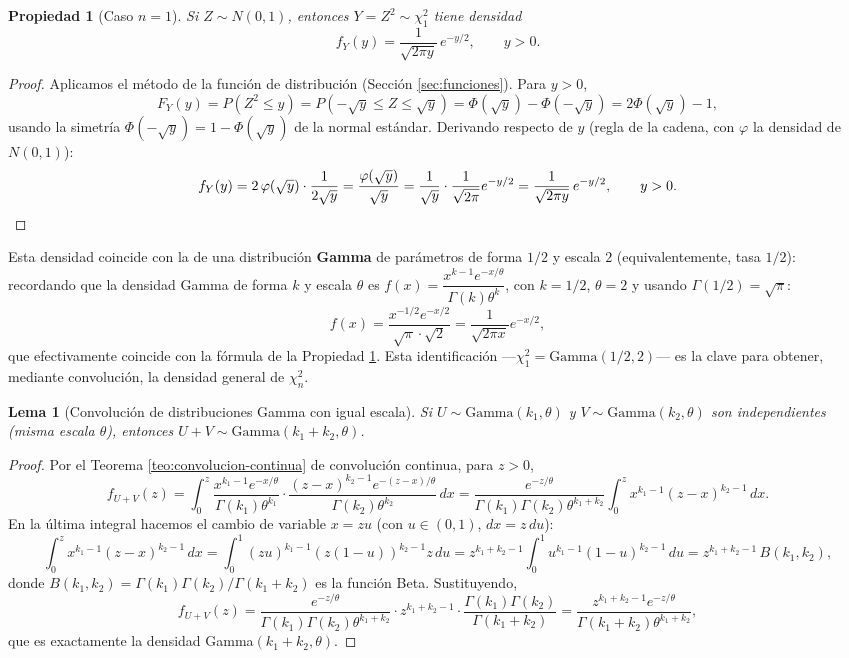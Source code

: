 \documentclass[11pt,a4paper]{article}
\theoremstyle{plain}
\newtheorem{propiedad}[teorema]{Propiedad}
\newtheorem{lema}[teorema]{Lema}
\theoremstyle{definition}
\theoremstyle{remark}
\begin{document}
\begin{propiedad}[Caso $n=1$]\label{prop:chi-uno}
Si $Z\sim N(0,1)$, entonces $Y=Z^2\sim\chi_1^2$ tiene densidad
\[
f_Y(y) = \frac{1}{\sqrt{2\pi y}}\,e^{-y/2}, \qquad y>0.
\]
\end{propiedad}

\begin{proof}
Aplicamos el método de la función de distribución (Sección \ref{sec:funciones}). Para $y>0$,
\[
F_Y(y) = P(Z^2\le y) = P(-\sqrt y\le Z\le \sqrt y) = \Phi(\sqrt y)-\Phi(-\sqrt y) = 2\Phi(\sqrt y)-1,
\]
usando la simetría $\Phi(-\sqrt y)=1-\Phi(\sqrt y)$ de la normal estándar. Derivando respecto de $y$ (regla de la cadena, con $\varphi$ la densidad de $N(0,1)$):
\[
f_Y(y) = 2\,\varphi(\sqrt y)\cdot\frac{1}{2\sqrt y} = \frac{\varphi(\sqrt y)}{\sqrt y} = \frac{1}{\sqrt y}\cdot\frac{1}{\sqrt{2\pi}}e^{-y/2} = \frac{1}{\sqrt{2\pi y}}\,e^{-y/2}, \qquad y>0. \qedhere
\]
\end{proof}

Esta densidad coincide con la de una distribución \textbf{Gamma} de parámetros de forma $1/2$ y escala $2$ (equivalentemente, tasa $1/2$): recordando que la densidad Gamma de forma $k$ y escala $\theta$ es $f(x) = \dfrac{x^{k-1}e^{-x/\theta}}{\Gamma(k)\theta^k}$, con $k=1/2$, $\theta=2$ y usando $\Gamma(1/2)=\sqrt\pi$:
\[
f(x) = \frac{x^{-1/2}e^{-x/2}}{\sqrt\pi\cdot\sqrt2} = \frac{1}{\sqrt{2\pi x}}e^{-x/2},
\]
que efectivamente coincide con la fórmula de la Propiedad \ref{prop:chi-uno}. Esta identificación —$\chi_1^2 = \text{Gamma}(1/2,2)$— es la clave para obtener, mediante convolución, la densidad general de $\chi_n^2$.

\begin{lema}[Convolución de distribuciones Gamma con igual escala]\label{lema:convolucion-gamma}
Si $U\sim\text{Gamma}(k_1,\theta)$ y $V\sim\text{Gamma}(k_2,\theta)$ son independientes (misma escala $\theta$), entonces $U+V\sim\text{Gamma}(k_1+k_2,\theta)$.
\end{lema}

\begin{proof}
Por el Teorema \ref{teo:convolucion-continua} de convolución continua, para $z>0$,
\[
f_{U+V}(z) = \int_0^z \frac{x^{k_1-1}e^{-x/\theta}}{\Gamma(k_1)\theta^{k_1}}\cdot\frac{(z-x)^{k_2-1}e^{-(z-x)/\theta}}{\Gamma(k_2)\theta^{k_2}}\,dx = \frac{e^{-z/\theta}}{\Gamma(k_1)\Gamma(k_2)\theta^{k_1+k_2}}\int_0^z x^{k_1-1}(z-x)^{k_2-1}\,dx.
\]
En la última integral hacemos el cambio de variable $x=zu$ (con $u\in(0,1)$, $dx=z\,du$):
\[
\int_0^z x^{k_1-1}(z-x)^{k_2-1}\,dx = \int_0^1 (zu)^{k_1-1}(z(1-u))^{k_2-1}z\,du = z^{k_1+k_2-1}\int_0^1 u^{k_1-1}(1-u)^{k_2-1}\,du = z^{k_1+k_2-1}\,B(k_1,k_2),
\]
donde $B(k_1,k_2)=\Gamma(k_1)\Gamma(k_2)/\Gamma(k_1+k_2)$ es la función Beta. Sustituyendo,
\[
f_{U+V}(z) = \frac{e^{-z/\theta}}{\Gamma(k_1)\Gamma(k_2)\theta^{k_1+k_2}}\cdot z^{k_1+k_2-1}\cdot\frac{\Gamma(k_1)\Gamma(k_2)}{\Gamma(k_1+k_2)} = \frac{z^{k_1+k_2-1}e^{-z/\theta}}{\Gamma(k_1+k_2)\theta^{k_1+k_2}},
\]
que es exactamente la densidad Gamma$(k_1+k_2,\theta)$.
\end{proof}
\end{document}
